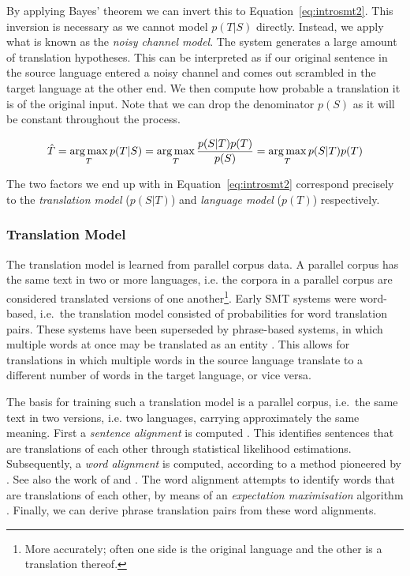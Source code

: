 By applying Bayes' theorem we can invert this to Equation~\ref{eq:introsmt2}.
This inversion is necessary as we cannot model $p(T|S)$ directly. Instead, we
apply what is known as the \emph{noisy channel model}. The system generates a
large amount of translation hypotheses. This can be interpreted as if our
original sentence in the source language entered a noisy channel and comes out
scrambled in the target language at the other end. We then compute how probable
a translation it is of the original input. Note that we can drop the
denominator $p(S)$ as it will be constant throughout the process.

\begin{equation}
\hat{T} = \operatorname*{arg\,max}_T p(T|S) = \operatorname*{arg\,max}_T \frac{p(S|T)p(T)}{p(S)} = \operatorname*{arg\,max}_T p(S|T)p(T)
\label{eq:introsmt2}
\end{equation}

The two factors we end up with in Equation~\ref{eq:introsmt2} correspond
precisely to the \emph{translation model} ($p(S|T)$) and \emph{language model}
($p(T)$) respectively.

\subsubsection{Translation Model}

The translation model is learned from parallel corpus data. A parallel corpus
has the same text in two or more languages, i.e. the corpora in a parallel corpus are considered translated versions of
one another\footnote{More accurately; often one side is the original language and the other is a translation thereof.}. Early SMT systems were word-based, i.e.\ the translation model
consisted of probabilities for word translation pairs. These systems have been
superseded by phrase-based systems, in which multiple words at once may be
translated as an entity \citep{PBSMT}. This allows for translations in which
multiple words in the source language translate to a different number of words in the target language, or vice versa.

The basis for training such a translation model is a parallel corpus, i.e.\ the
same text in two versions, i.e. two languages, carrying approximately the same meaning. First a \emph{sentence alignment} is computed
\citep{TIEDEMANN}. This identifies sentences that are translations of each other
through statistical likelihood estimations. Subsequently, a \emph{word alignment} is computed,
according to a method pioneered by \cite{BROWN}. See also the work of
\cite{OchNey2003} and \cite{TIEDEMANN}. The word alignment attempts to
identify words that are translations of each other, by means of an
\emph{expectation maximisation} algorithm \citep{EXPMAX}. Finally, we can derive phrase
translation pairs from these word alignments.

